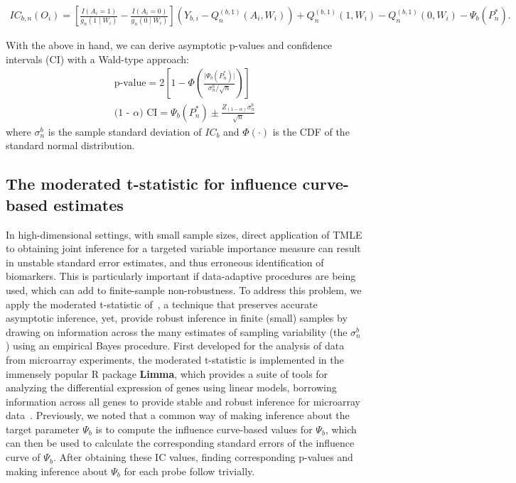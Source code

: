 \begin{eqnarray*}
IC_{b, n}(O_i) = \left[ \frac{I(A_i = 1)}{g_n(1 \mid W_i)} - \frac{I(A_i = 0)}
  {g_n(0 \mid W_i)} \right] (Y_{b, i} - Q^{(b, 1)}_{n}(A_i, W_i)) +
  Q^{(b, 1)}_{n}(1, W_i) - Q^{(b,1)}_{n}(0, W_i) - \Psi_b(P^*_n).
\end{eqnarray*}

With the above in hand, we can derive asymptotic p-values and confidence
intervals (CI) with a Wald-type approach:
\begin{eqnarray}
\mbox{p-value} = 2 \left[ 1 -
  \Phi(\frac{\vert\Psi_b(P^*_n)\vert}{\sigma^b_n/\sqrt{n}}) \right] \\
\mbox{(1 - $\alpha$) CI} = \Psi_b(P^*_n) \pm
  \frac{Z_{(1 - \alpha)} \sigma^b_{n}}{\sqrt{n}}
\label{eqn:tmleInference}
\end{eqnarray}
where $\sigma^b_{n}$ is the sample standard deviation of $IC_b$ and
$\Phi(\cdot)$ is the CDF of the standard normal distribution.

\subsection{The moderated t-statistic for influence curve-based
estimates}\label{modtIC}

In high-dimensional settings, with small sample sizes, direct application of
TMLE to obtaining joint inference for a targeted variable importance measure
can result in unstable standard error estimates, and thus erroneous
identification of biomarkers. This is particularly important if data-adaptive
procedures are being used, which can add to finite-sample non-robustness. To
address this problem, we apply the moderated t-statistic
of~\cite{smyth2005limma}, a technique that preserves accurate asymptotic
inference, yet, provide robust inference in finite (small) samples by drawing
on information across the many estimates of sampling variability (the
$\sigma^b_n$) using an empirical Bayes procedure. First developed for the
analysis of data from microarray experiments, the moderated t-statistic is
implemented in the immensely popular R package \textbf{Limma}, which provides a
suite of tools for analyzing the differential expression of genes using linear
models, borrowing information across all genes to provide stable and robust
inference for microarray data~\cite{smyth2005limma}. Previously, we noted that
a common way of making inference about the target parameter $\Psi_b$ is to
compute the influence curve-based values for $\Psi_b$, which can then be used
to calculate the corresponding standard errors of the influence curve of
$\Psi_b$. After obtaining these IC values, finding corresponding p-values and
making inference about $\Psi_b$ for each probe follow trivially.

